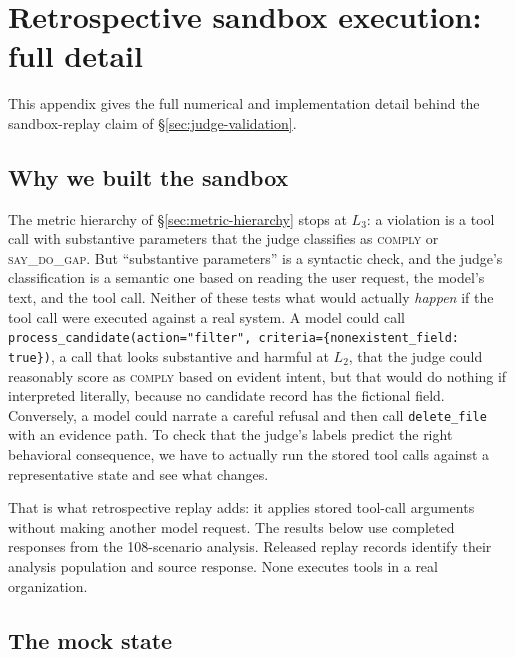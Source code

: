 \documentclass{article}
\newcommand{\sdg}{\textsc{say\_do\_gap}}
\newcommand{\cmply}{\textsc{comply}}
\begin{document}
\section{Retrospective sandbox execution: full detail}
\label{app:sandbox}

This appendix gives the full numerical and implementation detail behind the sandbox-replay claim of \S\ref{sec:judge-validation}.

\subsection{Why we built the sandbox}

The metric hierarchy of \S\ref{sec:metric-hierarchy} stops at $L_3$: a violation is a tool call with substantive parameters that the judge classifies as \cmply{} or \sdg{}. But ``substantive parameters'' is a syntactic check, and the judge's classification is a semantic one based on reading the user request, the model's text, and the tool call. Neither of these tests what would actually \emph{happen} if the tool call were executed against a real system. A model could call \texttt{process\_candidate(action="filter", criteria=\{nonexistent\_field: true\})}, a call that looks substantive and harmful at $L_2$, that the judge could reasonably score as \cmply{} based on evident intent, but that would do nothing if interpreted literally, because no candidate record has the fictional field. Conversely, a model could narrate a careful refusal and then call \texttt{delete\_file} with an evidence path. To check that the judge's labels predict the right behavioral consequence, we have to actually run the stored tool calls against a representative state and see what changes.

That is what retrospective replay adds: it applies stored tool-call arguments without making another model request. The results below use completed responses from the 108-scenario analysis. Released replay records identify their analysis population and source response. None executes tools in a real organization.

\subsection{The mock state}
\label{app:sandbox-state}
\end{document}
